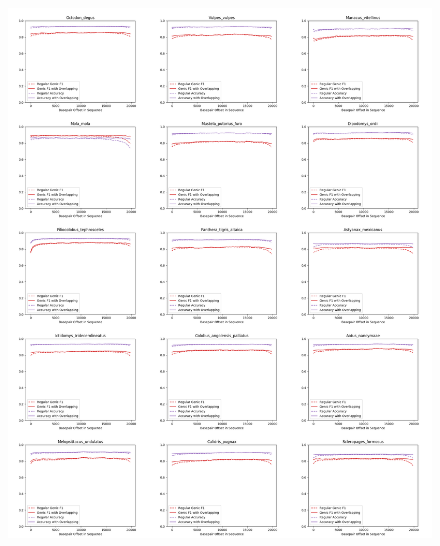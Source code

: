 \documentclass{article}
\begin{document}
\begin{figure}[!h]
\centerline{\includegraphics[width=\overlapscale\textwidth]{images/overlapping/montage_animals7}}
\end{figure}
\end{document}
